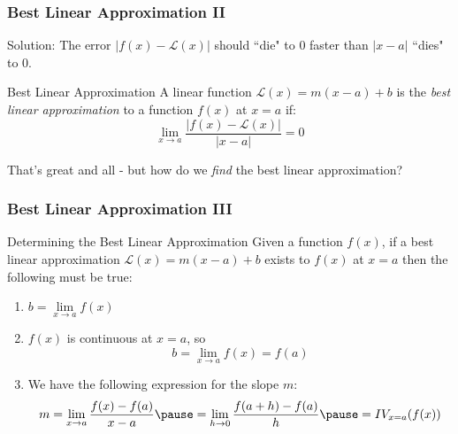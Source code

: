 \documentclass{ltx-talk}
\begin{document}
\begin{frame}
  \frametitle{Best Linear Approximation II}

  Solution: The error $|f(x) - \mathscr{L}(x)|$ should ``die" to $0$ faster than $|x - a|$ ``dies" to 0. \pause

  \begin{block}{Best Linear Approximation}
    A linear function $\mathscr{L}(x) = m(x - a) + b$ is the \textit{best linear approximation} to a function $f(x)$ at $x = a$ if: \pause
    \begin{equation}
      \lim\limits_{x \rightarrow a} \dfrac{|f(x) - \mathscr{L}(x)|}{|x - a|} = 0
    \end{equation} \pause
  \end{block}

  That's great and all - but how do we \textit{find} the best linear approximation?
\end{frame}

\begin{frame}
  \frametitle{Best Linear Approximation III}
  \begin{alertblock}{Determining the Best Linear Approximation}
    Given a function $f(x)$, if a best linear approximation 
    $\mathscr{L}(x) = m(x - a) + b$ exists
    to $f(x)$ at $x = a$ then the following must be true: \pause
    \begin{enumerate}
      \item $b = \lim\limits_{x \rightarrow a} f(x)$ \pause
      \item $f(x)$ is continuous at $x = a$, so \pause
        \begin{equation}
          b = \lim\limits_{x \rightarrow a} f(x) = f(a)
        \end{equation} \pause
      \item We have the following expression for the slope $m$:
        \begin{equation}
          m = \lim\limits_{x \rightarrow a} \dfrac{f(x) - f(a)}{x - a}
        \pause = \lim\limits_{h \rightarrow 0} \dfrac{f(a + h) - f(a)}{h}
          \pause = IV_{x = a}(f(x))
        \end{equation}
    \end{enumerate}
  \end{alertblock}
\end{frame}
\end{document}
